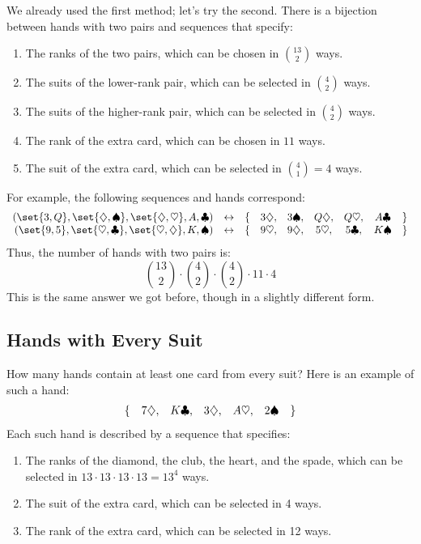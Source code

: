 We already used the first method; let's try the second.  There is a
bijection between hands with two pairs and sequences that specify:
%
\begin{enumerate}
\item The ranks of the two pairs, which can be chosen in $\binom{13}{2}$ ways.
\item The suits of the lower-rank pair, which can be selected in $\binom{4}{2}$ ways.
\item The suits of the higher-rank pair, which can be selected in $\binom{4}{2}$ ways.
\item The rank of the extra card, which can be chosen in $11$ ways.
\item The suit of the extra card, which can be selected in $\binom{4}{1} = 4$ ways.
\end{enumerate}
%
For example, the following sequences and hands correspond:
%
\[
\begin{array}{rcrcccccl}
(\set{3, Q}, \set{\dia, \spa}, \set{\dia, \hea}, A, \clu) & \leftrightarrow &
  \{ & 3 \dia, & 3 \spa, & Q \dia, & Q \hea, & A \clu & \} \\
(\set{9, 5}, \set{\hea, \clu}, \set{\hea, \dia}, K, \spa) & \leftrightarrow &
  \{ & 9 \hea, & 9 \dia, & 5 \hea, & 5 \clu, & K \spa & \}
\end{array}
\]
%
Thus, the number of hands with two pairs is:
%
\[
\binom{13}{2} \cdot \binom{4}{2} \cdot \binom{4}{2} \cdot 11 \cdot 4
\]
%
This is the same answer we got before, though in a slightly different
form.

\subsection{Hands with Every Suit}

How many hands contain at least one card from every suit?  Here is an
example of such a hand:
%
\[
\begin{array}{rcccccl}
\{ & 7 \diamondsuit, & K \clubsuit, & 3 \diamondsuit, & A \heartsuit, & 2 \spadesuit & \}
\end{array}
\]
%
Each such hand is described by a sequence that specifies:

\begin{enumerate}

\item The ranks of the diamond, the club, the heart, and the spade,
which can be selected in $13 \cdot 13 \cdot 13 \cdot 13 = 13^4$ ways.

\item The suit of the extra card, which can be selected in 4 ways.

\item The rank of the extra card, which can be selected in 12 ways.

\end{enumerate}

